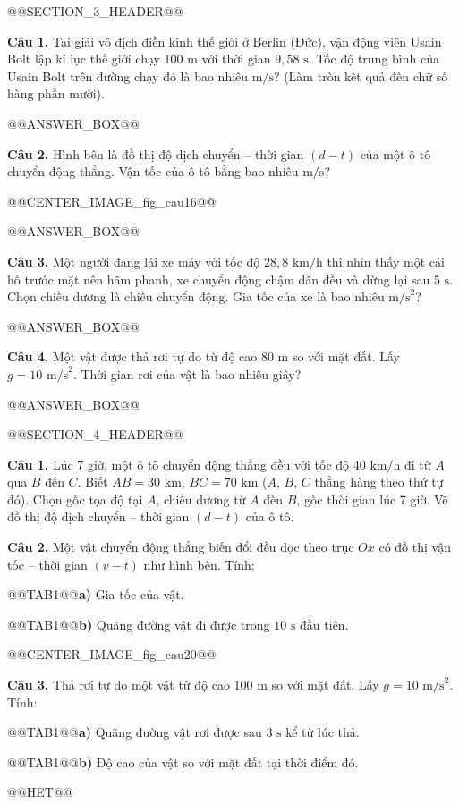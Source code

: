 \documentclass{article}
\begin{document}
@@SECTION_3_HEADER@@

\textbf{Câu 1.} Tại giải vô địch điền kinh thế giới ở Berlin (Đức), vận động viên Usain Bolt lập kỉ lục thế giới chạy $100\text{ m}$ với thời gian $9{,}58\text{ s}$. Tốc độ trung bình của Usain Bolt trên đường chạy đó là bao nhiêu $\text{m/s}$? (Làm tròn kết quả đến chữ số hàng phần mười).

@@ANSWER_BOX@@

\textbf{Câu 2.} Hình bên là đồ thị độ dịch chuyển -- thời gian $(d - t)$ của một ô tô chuyển động thẳng. Vận tốc của ô tô bằng bao nhiêu $\text{m/s}$?

@@CENTER_IMAGE_fig_cau16@@

@@ANSWER_BOX@@

\textbf{Câu 3.} Một người đang lái xe máy với tốc độ $28{,}8\text{ km/h}$ thì nhìn thấy một cái hố trước mặt nên hãm phanh, xe chuyển động chậm dần đều và dừng lại sau $5\text{ s}$. Chọn chiều dương là chiều chuyển động. Gia tốc của xe là bao nhiêu $\text{m/s}^2$?

@@ANSWER_BOX@@

\textbf{Câu 4.} Một vật được thả rơi tự do từ độ cao $80\text{ m}$ so với mặt đất. Lấy $g = 10\text{ m/s}^2$. Thời gian rơi của vật là bao nhiêu giây?

@@ANSWER_BOX@@

@@SECTION_4_HEADER@@

\textbf{Câu 1.} Lúc 7 giờ, một ô tô chuyển động thẳng đều với tốc độ $40\text{ km/h}$ đi từ $A$ qua $B$ đến $C$. Biết $AB = 30\text{ km}$, $BC = 70\text{ km}$ ($A$, $B$, $C$ thẳng hàng theo thứ tự đó). Chọn gốc tọa độ tại $A$, chiều dương từ $A$ đến $B$, gốc thời gian lúc 7 giờ. Vẽ đồ thị độ dịch chuyển -- thời gian $(d - t)$ của ô tô.

\textbf{Câu 2.} Một vật chuyển động thẳng biến đổi đều dọc theo trục $Ox$ có đồ thị vận tốc -- thời gian $(v - t)$ như hình bên. Tính:

@@TAB1@@\textbf{a)} Gia tốc của vật.

@@TAB1@@\textbf{b)} Quãng đường vật đi được trong $10\text{ s}$ đầu tiên.

@@CENTER_IMAGE_fig_cau20@@

\textbf{Câu 3.} Thả rơi tự do một vật từ độ cao $100\text{ m}$ so với mặt đất. Lấy $g = 10\text{ m/s}^2$. Tính:

@@TAB1@@\textbf{a)} Quãng đường vật rơi được sau $3\text{ s}$ kể từ lúc thả.

@@TAB1@@\textbf{b)} Độ cao của vật so với mặt đất tại thời điểm đó.



@@HET@@
\end{document}
